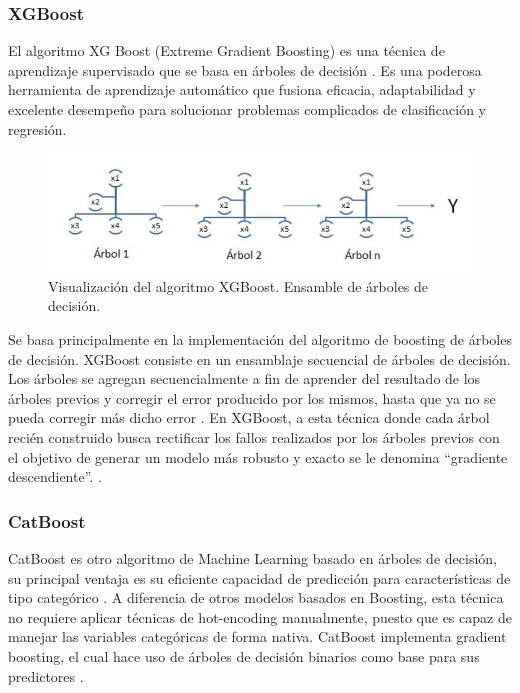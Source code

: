 \documentclass[11pt,a4paper,spanish]{book}
\numberwithin{equation}{chapter}
\numberwithin{figure}{chapter}
\begin{document}
\subsubsection{XGBoost}

El algoritmo XG Boost (Extreme Gradient Boosting) es una técnica de aprendizaje supervisado que se basa en árboles de decisión \cite{chen2016xgboost}.  Es una poderosa herramienta de aprendizaje automático que fusiona eficacia, adaptabilidad y excelente desempeño para solucionar problemas complicados de clasificación y regresión. 

\begin{figure}[h]
    \centering
    \includegraphics[width=1.0\textwidth]{media/xgboost-salman.png}
    \caption{Visualización del algoritmo XGBoost. Ensamble de árboles de decisión.  \protect\cite{salman2024rf} }
    \label{fig:figXGBoostSalman}
\end{figure}


Se basa principalmente en la implementación del algoritmo de boosting de árboles de decisión. XGBoost consiste en un ensamblaje secuencial de árboles de decisión. Los árboles se agregan secuencialmente a fin de aprender del resultado de los árboles previos y corregir el error producido por los mismos, hasta que ya no se pueda corregir más dicho error \cite{salman2024rf}.  En XGBoost, a esta técnica donde cada árbol recién construido busca rectificar los fallos realizados por los árboles previos con el objetivo de generar un modelo más robusto y exacto se le denomina “gradiente descendiente”. \cite{espinoza2020rf_xgboost}.

\subsubsection{CatBoost}

CatBoost es otro algoritmo de Machine Learning basado en árboles de decisión, su principal ventaja es su eficiente capacidad de predicción para características de tipo categórico  \cite{ibrahim2020catboost}. A diferencia de otros modelos basados en Boosting, esta técnica no requiere aplicar técnicas de hot-encoding manualmente, puesto que es capaz de manejar las variables categóricas de forma nativa. CatBoost implementa gradient boosting, el cual hace uso de árboles de decisión binarios como base para sus predictores \cite{prokhorenkova2018catboost}.
\end{document}

